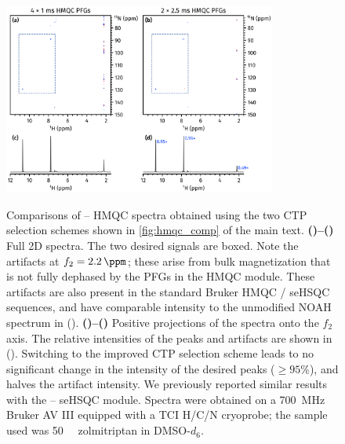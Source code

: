 \documentclass[a4paper,11pt]{article}
\newcommand{\proton}{\ch{^{1}H}}
\newcommand{\nitrogen}{\ch{^{15}N}}
\newcommand{\HN}{\proton{}--\nitrogen{}}
\newcommand*{\zolmi}{Spectra were obtained on a \SI{700}{\MHz} Bruker AV III equipped with a TCI H/C/N cryoprobe; the sample used was \SI{50}{\milli\molar} zolmitriptan in DMSO-\(d_6\).}
\begin{document}
\begin{refsection}
\begin{figure}[H]
    \centering
    \includegraphics[width=0.8\textwidth]{hmqc_comp_snr.png}
    {\label{fig:hmqc_comp_snr_bad2d}}
    {\label{fig:hmqc_comp_snr_good2d}}
    {\label{fig:hmqc_comp_snr_bad1d}}
    {\label{fig:hmqc_comp_snr_good1d}}
    \caption{
        Comparisons of \HN{} HMQC spectra obtained using the two CTP selection schemes shown in \cref{fig:hmqc_comp} of the main text.
        \textbf{()--()} Full 2D spectra.
        The two desired signals are boxed.
        Note the artifacts at \(f_2 = \SI{2.2}{\ppm}\); these arise from bulk magnetization that is not fully dephased by the PFGs in the HMQC module.\autocite{Yong2021JMR}
        These artifacts are also present in the standard Bruker HMQC / seHSQC sequences, and have comparable intensity to the unmodified NOAH spectrum in ().
        \textbf{()--()} Positive projections of the spectra onto the \(f_2\) axis.
        The relative intensities of the peaks and artifacts are shown in ().
        Switching to the improved CTP selection scheme leads to no significant change in the intensity of the desired peaks (\(\geq 95\%\)), and halves the artifact intensity.
        We previously reported similar results with the \HN{} seHSQC module.\autocite{Yong2021JMR}
        \zolmi{}
    }
    \label{fig:hmqc_comp_snr}
\end{figure}

\AtNextBibliography{\small}
\printbibliography{}
\clearpage    %

\end{refsection}
\end{document}
